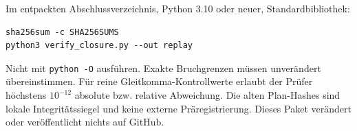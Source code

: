 \documentclass[11pt,a4paper]{article}
\newcommand{\sect}[1]{\par\vspace{3pt}{\sffamily\bfseries\large #1}\par}
\begin{document}
\sect{Wiederholung}
Im entpackten Abschlussverzeichnis, Python 3.10 oder neuer, Standardbibliothek:
\begin{verbatim}
sha256sum -c SHA256SUMS
python3 verify_closure.py --out replay
\end{verbatim}
Nicht mit \texttt{python -O} ausführen. Exakte Bruchgrenzen müssen unverändert übereinstimmen. Für reine Gleitkomma-Kontrollwerte erlaubt der Prüfer höchstens $10^{-12}$ absolute bzw. relative Abweichung. Die alten Plan-Hashes sind lokale Integritätssiegel und keine externe Präregistrierung. Dieses Paket verändert oder veröffentlicht nichts auf GitHub.
\end{document}
